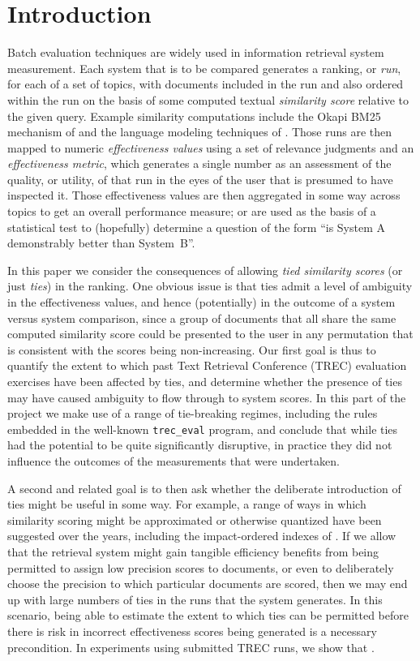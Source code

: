 \section{Introduction}
\label{sec-intro}

Batch evaluation techniques are widely used in information retrieval
system measurement.
Each system that is to be compared generates a ranking, or
{\emph{run}}, for each of a set of topics, with documents included in
the run and also ordered within the run on the basis of some computed
textual {\emph{similarity score}} relative to the given query.
Example similarity computations include the Okapi BM25 mechanism of
{\citet{rwjhg94trec}} and the language modeling techniques of
{\citet{pc98sigir}}.
Those runs are then mapped to numeric {\emph{effectiveness values}}
using a set of relevance judgments and an {\emph{effectiveness
metric}}, which generates a single number as an assessment of the
quality, or utility, of that run in the eyes of the user that is
presumed to have inspected it.
Those effectiveness values are then aggregated in some way across
topics to get an overall performance measure; or are used as the basis
of a statistical test to (hopefully) determine a question of the form
``is System A demonstrably better than System~B''.

In this paper we consider the consequences of allowing {\emph{tied
similarity scores}} (or just {\emph{ties}}) in the ranking.
One obvious issue is that ties admit a level of ambiguity in the
effectiveness values, and hence (potentially) in the outcome of a
system versus system comparison, since a group of documents that all
share the same computed similarity score could be presented to the
user in any permutation that is consistent with the scores being
non-increasing.
Our first goal is thus to quantify the extent to which past Text
Retrieval Conference (TREC) evaluation exercises have been affected
by ties, and determine whether the presence of ties may have caused
ambiguity to flow through to system scores.
In this part of the project we make use of a range of tie-breaking
regimes, including the rules embedded in the well-known
{\tt{trec\_eval}} program, and conclude that while ties had the
potential to be quite significantly disruptive, in practice they did
not influence the outcomes of the measurements that were undertaken.

A second and related goal is to then ask whether the deliberate
introduction of ties might be useful in some way.
For example, a range of ways in which similarity scoring might be
approximated or otherwise quantized have been suggested over the
years, including the impact-ordered indexes of {\citet{am06sigir}}.
If we allow that the retrieval system might gain tangible efficiency
benefits from being permitted to assign low precision scores to
documents, or even to deliberately choose the precision to which
particular documents are scored, then we may end up with large
numbers of ties in the runs that the system generates.
In this scenario, being able to estimate the extent to which ties can
be permitted before there is risk in incorrect effectiveness scores
being generated is a necessary precondition.
In experiments using submitted TREC runs, we show that
{}.

{}
